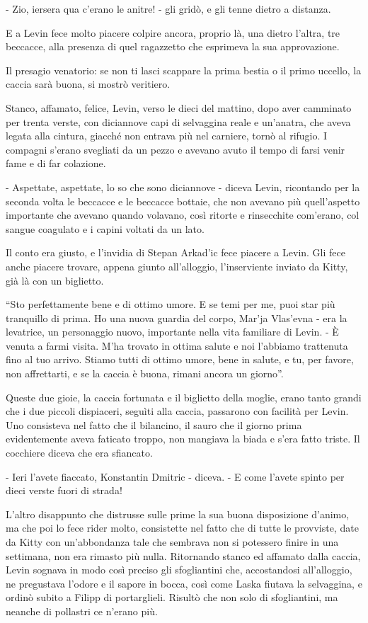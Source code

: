 - Zio, iersera qua c'erano le anitre! - gli gridò, e gli tenne dietro a distanza. 

E a Levin fece molto piacere colpire ancora, proprio là, una dietro l'altra, tre beccacce, alla presenza di quel ragazzetto che esprimeva la sua approvazione. 

Il presagio venatorio: se non ti lasci scappare la prima bestia o il primo uccello, la caccia sarà buona, si mostrò veritiero. 

Stanco, affamato, felice, Levin, verso le dieci del mattino, dopo aver camminato per trenta verste, con diciannove capi di selvaggina reale e un'anatra, che aveva legata alla cintura, giacché non entrava più nel carniere, tornò al rifugio. I compagni s'erano svegliati da un pezzo e avevano avuto il tempo di farsi venir fame e di far colazione. 

- Aspettate, aspettate, lo so che sono diciannove - diceva Levin, ricontando per la seconda volta le beccacce e le beccacce bottaie, che non avevano più quell'aspetto importante che avevano quando volavano, così ritorte e rinsecchite com'erano, col sangue coagulato e i capini voltati da un lato. 

Il conto era giusto, e l'invidia di Stepan Arkad'ic fece piacere a Levin. Gli fece anche piacere trovare, appena giunto all'alloggio, l'inserviente inviato da Kitty, già là con un biglietto. 

``Sto perfettamente bene e di ottimo umore. E se temi per me, puoi star più tranquillo di prima. Ho una nuova guardia del corpo, Mar'ja Vlas'evna - era la levatrice, un personaggio nuovo, importante nella vita familiare di Levin. - È venuta a farmi visita. M'ha trovato in ottima salute e noi l'abbiamo trattenuta fino al tuo arrivo. Stiamo tutti di ottimo umore, bene in salute, e tu, per favore, non affrettarti, e se la caccia è buona, rimani ancora un giorno''. 

Queste due gioie, la caccia fortunata e il biglietto della moglie, erano tanto grandi che i due piccoli dispiaceri, seguìti alla caccia, passarono con facilità per Levin. Uno consisteva nel fatto che il bilancino, il sauro che il giorno prima evidentemente aveva faticato troppo, non mangiava la biada e s'era fatto triste. Il cocchiere diceva che era sfiancato. 

- Ieri l'avete fiaccato, Konstantin Dmitric - diceva. - E come l'avete spinto per dieci verste fuori di strada! 

L'altro disappunto che distrusse sulle prime la sua buona disposizione d'animo, ma che poi lo fece rider molto, consistette nel fatto che di tutte le provviste, date da Kitty con un'abbondanza tale che sembrava non si potessero finire in una settimana, non era rimasto più nulla. Ritornando stanco ed affamato dalla caccia, Levin sognava in modo così preciso gli sfogliantini che, accostandosi all'alloggio, ne pregustava l'odore e il sapore in bocca, così come Laska fiutava la selvaggina, e ordinò subito a Filipp di portarglieli. Risultò che non solo di sfogliantini, ma neanche di pollastri ce n'erano più. 

